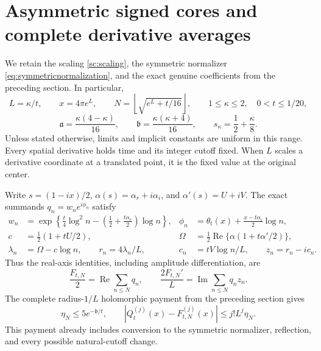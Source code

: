 \documentclass[11pt]{article}
\numberwithin{equation}{section}
\theoremstyle{definition}
\theoremstyle{remark}
\DeclareMathOperator{\Rea}{Re}
\DeclareMathOperator{\Ima}{Im}
\begin{document}

\section{Asymmetric signed cores and complete derivative averages}
\label{lj:cores}

We retain the scaling \eqref{sc:scaling}, the symmetric normalizer
\eqref{eq:symmetricnormalization}, and the exact genuine coefficients from
the preceding section. In particular,
\[
 L=\kappa/t,\qquad x=4\pi e^L,\qquad
 N=\left\lfloor\sqrt{e^L+t/16}\right\rfloor,\qquad
 1\le\kappa\le2,\quad 0<t\le1/20,
\]
\[
 \mathfrak a=\frac{\kappa(4-\kappa)}{16},\qquad
 \mathfrak b=\frac{\kappa(\kappa+4)}{16},\qquad
 s_\kappa=\frac12+\frac{\kappa}{8}.
\]
Unless stated otherwise, limits and implicit constants are uniform in this
range. Every spatial derivative holds time and its integer cutoff fixed.
When \(L\) scales a derivative coordinate at a translated point, it is the
fixed value at the original center.

Write \(s=(1-ix)/2\), \(\alpha(s)=\alpha_r+i\alpha_i\), and
\(\alpha'(s)=U+iV\). The exact summands \(q_n=w_ne^{i\phi_n}\) satisfy
\begin{align}
 w_n&=\exp\left\{\frac t4\log^2n-
             \left(\frac12+\frac{t\alpha_r}{2}\right)\log n\right\},
 &\phi_n&=\theta_t(x)+\frac{x-t\alpha_i}{2}\log n,
 \label{lj:exactdata}\\
 c&=\frac12(1+tU/2),
 &\Omega&=\frac12\Rea\{\alpha(1+t\alpha'/2)\},\nonumber\\
 \lambda_n&=\Omega-c\log n,\qquad r_n=4\lambda_n/L,
 &c_n&=tV\log n/L,\qquad z_n=r_n-ic_n.\nonumber
\end{align}
Thus the real-axis identities, including amplitude differentiation, are
\begin{equation}\label{lj:exactcoordinates}
 \frac{F_{t,N}}2=\Rea\sum_{n\le N}q_n,\qquad
 \frac{2F_{t,N}'}L=\Ima\sum_{n\le N}q_nz_n.
\end{equation}
The complete radius-\(1/L\) holomorphic payment from the preceding
section gives
\begin{equation}\label{lj:cauchypayment}
 \eta_N\le5e^{-\mathfrak b/t},\qquad
 |Q_t^{(j)}(x)-F_{t,N}^{(j)}(x)|\le j!L^j\eta_N.
\end{equation}
This payment already includes conversion to the symmetric normalizer,
reflection, and every possible natural-cutoff change.
\end{document}
